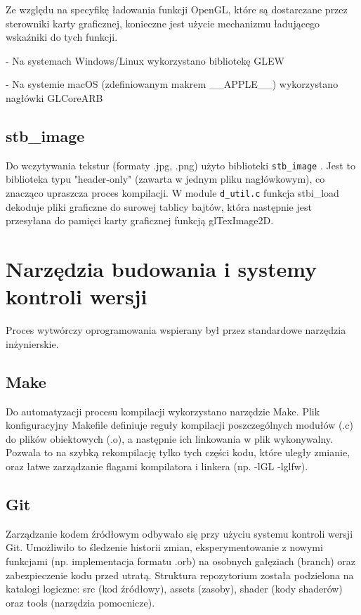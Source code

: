          Ze względu na specyfikę ładowania funkcji OpenGL, które są dostarczane przez sterowniki karty graficznej, konieczne jest użycie mechanizmu ładującego wskaźniki do tych funkcji.

         \bigbreak

         - Na systemach Windows/Linux wykorzystano bibliotekę GLEW \cite{online_glew_docs}

         - Na systemie macOS (zdefiniowanym makrem \_\_APPLE\_\_) wykorzystano nagłówki GLCoreARB

        \subsection{stb\_image}
        
         Do wczytywania tekstur (formaty .jpg, .png) użyto biblioteki \texttt{stb\_image} \cite{online_stb_image}. Jest to biblioteka typu "header-only" (zawarta w jednym pliku nagłówkowym), co znacząco upraszcza proces kompilacji. W module \texttt{d\_util.c} funkcja stbi\_load dekoduje pliki graficzne do surowej tablicy bajtów, która następnie jest przesyłana do pamięci karty graficznej funkcją glTexImage2D.

   \newpage

    \section{Narzędzia budowania i systemy kontroli wersji}

     Proces wytwórczy oprogramowania wspierany był przez standardowe narzędzia inżynierskie.

        \subsection{Make}

         Do automatyzacji procesu kompilacji wykorzystano narzędzie Make. Plik konfiguracyjny Makefile definiuje reguły kompilacji poszczególnych modułów (.c) do plików obiektowych (.o), a następnie ich linkowania w plik wykonywalny. Pozwala to na szybką rekompilację tylko tych części kodu, które uległy zmianie, oraz łatwe zarządzanie flagami kompilatora i linkera (np. -lGL -lglfw).

        \subsection{Git}

         Zarządzanie kodem źródłowym odbywało się przy użyciu systemu kontroli wersji Git. Umożliwiło to śledzenie historii zmian, eksperymentowanie z nowymi funkcjami (np. implementacja formatu .orb) na osobnych gałęziach (branch) oraz zabezpieczenie kodu przed utratą. Struktura repozytorium została podzielona na katalogi logiczne: src (kod źródłowy), assets (zasoby), shader (kody shaderów) oraz tools (narzędzia pomocnicze).